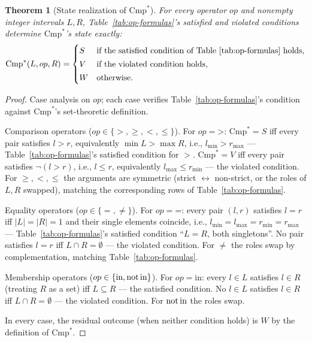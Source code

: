 \documentclass[pdflatex,sn-basic]{sn-jnl}%
\theoremstyle{thmstyleone}%
\newtheorem{theorem}{Theorem}%
\theoremstyle{thmstyletwo}%
\theoremstyle{thmstylethree}%
\begin{document}
\begin{theorem}[State realization of $\text{Cmp}^*$]\label{thm:state-realization}
For every operator $op$ and nonempty integer intervals $L, R$, Table~\ref{tab:op-formulas}'s satisfied and violated conditions determine $\text{Cmp}^*$'s state exactly:
\[
\text{Cmp}^*(L, op, R) =
\begin{cases}
S & \text{if the satisfied condition of Table~\ref{tab:op-formulas} holds,} \\[2pt]
V & \text{if the violated condition holds,} \\[2pt]
W & \text{otherwise.}
\end{cases}
\]
\end{theorem}

\begin{proof}
Case analysis on $op$; each case verifies Table~\ref{tab:op-formulas}'s condition against $\text{Cmp}^*$'s set-theoretic definition.

Comparison operators ($op \in \{>, \geq, <, \leq\}$).
For $op = \mathord{>}$: $\text{Cmp}^* = S$ iff every pair satisfies $l > r$, equivalently $\min L > \max R$, i.e., $l_{\min} > r_{\max}$ --- Table~\ref{tab:op-formulas}'s satisfied condition for $>$.
$\text{Cmp}^* = V$ iff every pair satisfies $\neg(l > r)$, i.e., $l \leq r$, equivalently $l_{\max} \leq r_{\min}$ --- the violated condition.
For $\geq, <, \leq$ the arguments are symmetric (strict $\leftrightarrow$ non-strict, or the roles of $L, R$ swapped), matching the corresponding rows of Table~\ref{tab:op-formulas}.

Equality operators ($op \in \{=, \neq\}$).
For $op = \mathord{=}$: every pair $(l, r)$ satisfies $l = r$ iff $|L| = |R| = 1$ and their single elements coincide, i.e., $l_{\min} = l_{\max} = r_{\min} = r_{\max}$ --- Table~\ref{tab:op-formulas}'s satisfied condition ``$L = R$, both singletons''.
No pair satisfies $l = r$ iff $L \cap R = \emptyset$ --- the violated condition.
For $\neq$ the roles swap by complementation, matching Table~\ref{tab:op-formulas}.

Membership operators ($op \in \{\text{in}, \text{not\,in}\}$).
For $op = \text{in}$: every $l \in L$ satisfies $l \in R$ (treating $R$ as a set) iff $L \subseteq R$ --- the satisfied condition.
No $l \in L$ satisfies $l \in R$ iff $L \cap R = \emptyset$ --- the violated condition.
For $\text{not\,in}$ the roles swap.

In every case, the residual outcome (when neither condition holds) is $W$ by the definition of $\text{Cmp}^*$.
\end{proof}
\end{document}
